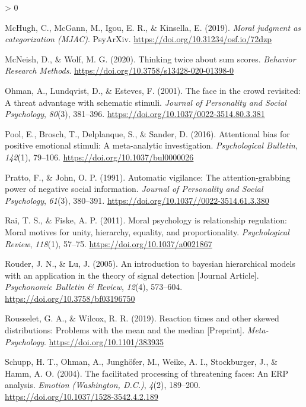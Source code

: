 \documentclass[
  english,
  man]{apa6}
\newlength{\cslhangindent}
\newenvironment{CSLReferences}[2] %
 {%
  \setlength{\parindent}{0pt}
  \ifodd #1 \everypar{\setlength{\hangindent}{\cslhangindent}}\ignorespaces\fi
  \ifnum #2 > 0
  \setlength{\parskip}{#2\baselineskip}
  \fi
 }%
 {}
\begin{document}
\begin{CSLReferences}{1}{0}
\leavevmode\hypertarget{ref-mchugh_moral_2019}{}%
McHugh, C., McGann, M., Igou, E. R., \& Kinsella, E. (2019). \emph{Moral judgment as categorization ({MJAC})}. {PsyArXiv}. \url{https://doi.org/10.31234/osf.io/72dzp}

\leavevmode\hypertarget{ref-mcneish_thinking_2020}{}%
McNeish, D., \& Wolf, M. G. (2020). Thinking twice about sum scores. \emph{Behavior Research Methods}. \url{https://doi.org/10.3758/s13428-020-01398-0}

\leavevmode\hypertarget{ref-ohman_face_2001}{}%
Ohman, A., Lundqvist, D., \& Esteves, F. (2001). The face in the crowd revisited: A threat advantage with schematic stimuli. \emph{Journal of Personality and Social Psychology}, \emph{80}(3), 381--396. \url{https://doi.org/10.1037/0022-3514.80.3.381}

\leavevmode\hypertarget{ref-pool_attentional_2016}{}%
Pool, E., Brosch, T., Delplanque, S., \& Sander, D. (2016). Attentional bias for positive emotional stimuli: A meta-analytic investigation. \emph{Psychological Bulletin}, \emph{142}(1), 79--106. \url{https://doi.org/10.1037/bul0000026}

\leavevmode\hypertarget{ref-pratto_automatic_1991}{}%
Pratto, F., \& John, O. P. (1991). Automatic vigilance: The attention-grabbing power of negative social information. \emph{Journal of Personality and Social Psychology}, \emph{61}(3), 380--391. \url{https://doi.org/10.1037//0022-3514.61.3.380}

\leavevmode\hypertarget{ref-rai_moral_2011}{}%
Rai, T. S., \& Fiske, A. P. (2011). Moral psychology is relationship regulation: Moral motives for unity, hierarchy, equality, and proportionality. \emph{Psychological Review}, \emph{118}(1), 57--75. \url{https://doi.org/10.1037/a0021867}

\leavevmode\hypertarget{ref-Rouder_2005_BHM_SDT}{}%
Rouder, J. N., \& Lu, J. (2005). An introduction to bayesian hierarchical models with an application in the theory of signal detection {[}Journal Article{]}. \emph{Psychonomic Bulletin \& Review}, \emph{12}(4), 573--604. \url{https://doi.org/10.3758/bf03196750}

\leavevmode\hypertarget{ref-Rousselet_2019}{}%
Rousselet, G. A., \& Wilcox, R. R. (2019). Reaction times and other skewed distributions: Problems with the mean and the median {[}Preprint{]}. \emph{Meta-Psychology}. \url{https://doi.org/10.1101/383935}

\leavevmode\hypertarget{ref-schupp_facilitated_2004}{}%
Schupp, H. T., Ohman, A., Junghöfer, M., Weike, A. I., Stockburger, J., \& Hamm, A. O. (2004). The facilitated processing of threatening faces: An {ERP} analysis. \emph{Emotion (Washington, D.C.)}, \emph{4}(2), 189--200. \url{https://doi.org/10.1037/1528-3542.4.2.189}


\end{CSLReferences}
\end{document}
